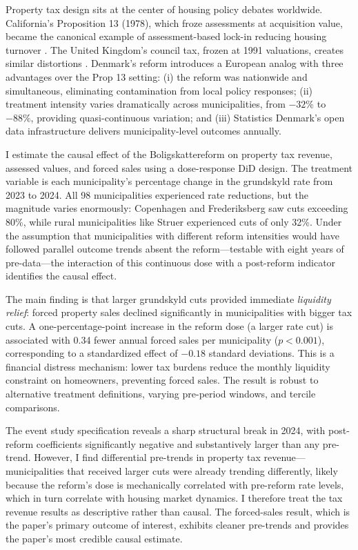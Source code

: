 \documentclass[12pt]{article}
\begin{document}
Property tax design sits at the center of housing policy debates worldwide. California's Proposition 13 (1978), which froze assessments at acquisition value, became the canonical example of assessment-based lock-in reducing housing turnover \citep{ferreira2010you}. The United Kingdom's council tax, frozen at 1991 valuations, creates similar distortions \citep{mirrlees2011tax}. Denmark's reform introduces a European analog with three advantages over the Prop 13 setting: (i) the reform was nationwide and simultaneous, eliminating contamination from local policy responses; (ii) treatment intensity varies dramatically across municipalities, from $-32\%$ to $-88\%$, providing quasi-continuous variation; and (iii) Statistics Denmark's open data infrastructure delivers municipality-level outcomes annually.

I estimate the causal effect of the Boligskattereform on property tax revenue, assessed values, and forced sales using a dose-response DiD design. The treatment variable is each municipality's percentage change in the grundskyld rate from 2023 to 2024. All 98 municipalities experienced rate reductions, but the magnitude varies enormously: Copenhagen and Frederiksberg saw cuts exceeding 80\%, while rural municipalities like Struer experienced cuts of only 32\%. Under the assumption that municipalities with different reform intensities would have followed parallel outcome trends absent the reform---testable with eight years of pre-data---the interaction of this continuous dose with a post-reform indicator identifies the causal effect.

The main finding is that larger grundskyld cuts provided immediate \textit{liquidity relief}: forced property sales declined significantly in municipalities with bigger tax cuts. A one-percentage-point increase in the reform dose (a larger rate cut) is associated with 0.34 fewer annual forced sales per municipality ($p < 0.001$), corresponding to a standardized effect of $-0.18$ standard deviations. This is a financial distress mechanism: lower tax burdens reduce the monthly liquidity constraint on homeowners, preventing forced sales. The result is robust to alternative treatment definitions, varying pre-period windows, and tercile comparisons.

The event study specification reveals a sharp structural break in 2024, with post-reform coefficients significantly negative and substantively larger than any pre-trend. However, I find differential pre-trends in property tax revenue---municipalities that received larger cuts were already trending differently, likely because the reform's dose is mechanically correlated with pre-reform rate levels, which in turn correlate with housing market dynamics. I therefore treat the tax revenue results as descriptive rather than causal. The forced-sales result, which is the paper's primary outcome of interest, exhibits cleaner pre-trends and provides the paper's most credible causal estimate.
\end{document}
